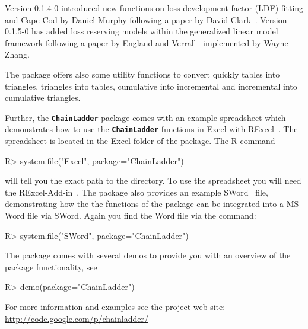 \documentclass{article}
\newcommand{\chainladder}{\textbf{\texttt{ChainLadder}} }
\begin{document}
Version 0.1.4-0 introduced new functions on loss development factor
(LDF) fitting and Cape Cod by Daniel Murphy following a paper by David
Clark~\cite{Clark2003}.  Version 0.1.5-0 has added loss reserving
models within the generalized linear model framework following a paper by
England and Verrall~\cite{EnglandVerrall1999} implemented by Wayne
Zhang.  

The package offers also some utility functions to convert quickly
tables into triangles, triangles into tables, cumulative into
incremental and incremental into cumulative triangles. 

Further, the \chainladder package comes with an example spreadsheet which
demonstrates how to use the \chainladder functions in Excel with
RExcel~\cite{rexcel}. The  spreadsheet is located in the Excel folder
of the package. The R command 
\begin{Schunk}
\begin{Sinput}
R> system.file("Excel", package="ChainLadder") 
\end{Sinput}
\end{Schunk}
will tell you the exact path to the directory. To use the spreadsheet you will need the
RExcel-Add-in~\cite{BaierNeuwirth2007}. The package also provides an
example SWord~\cite{BaierNeuwirth2007} file,  demonstrating how the
the functions of the package can be integrated into a MS Word file via
SWord. Again you find the Word file via the command: 
\begin{Schunk}
\begin{Sinput}
R> system.file("SWord", package="ChainLadder") 
\end{Sinput}
\end{Schunk}

The package comes with several demos to provide you with an overview
of the package functionality, see
\begin{Schunk}
\begin{Sinput}
R> demo(package="ChainLadder")
\end{Sinput}
\end{Schunk}
For more information and examples see the project web site:
\url{http://code.google.com/p/chainladder/}
\end{document}
